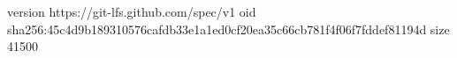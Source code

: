 version https://git-lfs.github.com/spec/v1
oid sha256:45c4d9b189310576cafdb33e1a1ed0cf20ea35c66cb781f4f06f7fddef81194d
size 41500
